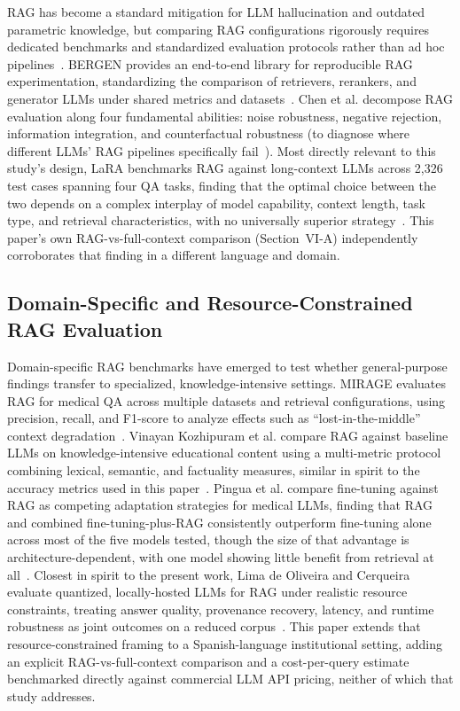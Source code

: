 \documentclass[conference]{IEEEtran}
\begin{document}
\gls{RAG} has become a standard mitigation for \gls{LLM} hallucination and outdated parametric knowledge, but comparing RAG configurations rigorously requires dedicated benchmarks and standardized evaluation protocols rather than ad hoc pipelines~\cite{rau2024bergen}.
BERGEN provides an end-to-end library for reproducible RAG experimentation, standardizing the comparison of retrievers, rerankers, and generator \glspl{LLM} under shared metrics and datasets~\cite{rau2024bergen}.
Chen et al. decompose RAG evaluation along four fundamental abilities: noise robustness, negative rejection, information integration, and counterfactual robustness (to diagnose where different LLMs' RAG pipelines specifically fail~\cite{chen2024rgb}).
Most directly relevant to this study's design, LaRA benchmarks RAG against long-context LLMs across 2{,}326 test cases spanning four \gls{QA} tasks, finding that the optimal choice between the two depends on a complex interplay of model capability, context length, task type, and retrieval characteristics, with no universally superior strategy~\cite{li2025lara}. This paper's own RAG-vs-full-context comparison (Section~VI-A) independently corroborates that finding in a different language and domain.

\subsection{Domain-Specific and Resource-Constrained RAG Evaluation}

Domain-specific RAG benchmarks have emerged to test whether general-purpose findings transfer to specialized, knowledge-intensive settings.
MIRAGE evaluates RAG for medical \gls{QA} across multiple datasets and retrieval configurations, using precision, recall, and F1-score to analyze effects such as ``lost-in-the-middle'' context degradation~\cite{xiong2024mirage}.
Vinayan Kozhipuram et al. compare RAG against baseline LLMs on knowledge-intensive educational content using a multi-metric protocol combining lexical, semantic, and factuality measures, similar in spirit to the accuracy metrics used in this paper~\cite{vinayankozhipuram2025multimetric}.
Pingua et al. compare fine-tuning against RAG as competing adaptation strategies for medical LLMs, finding that RAG and combined fine-tuning-plus-RAG consistently outperform fine-tuning alone across most of the five models tested, though the size of that advantage is architecture-dependent, with one model showing little benefit from retrieval at all~\cite{pingua2025medicalllms}.
Closest in spirit to the present work, Lima de Oliveira and Cerqueira evaluate quantized, locally-hosted LLMs for RAG under realistic resource constraints, treating answer quality, provenance recovery, latency, and runtime robustness as joint outcomes on a reduced corpus~\cite{limadeoliveira2026quantizedrag}.
This paper extends that resource-constrained framing to a Spanish-language institutional setting, adding an explicit RAG-vs-full-context comparison and a cost-per-query estimate benchmarked directly against commercial \gls{LLM} API pricing, neither of which that study addresses.
\end{document}
